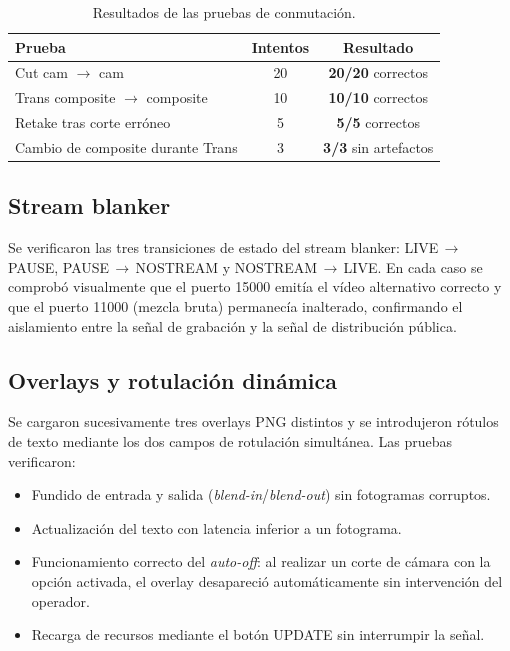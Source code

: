 \begin{table}[H]
  \centering
  \caption{Resultados de las pruebas de conmutación.}
  \label{tab:pruebas_conmutacion}
  \begin{tabular}{|l|c|c|}
    \hline
    \textbf{Prueba} & \textbf{Intentos} & \textbf{Resultado} \\
    \hline
    Cut cam $\rightarrow$ cam            & 20 & \textbf{20/20} correctos \\
    Trans composite $\rightarrow$ composite & 10 & \textbf{10/10} correctos \\
    Retake tras corte erróneo           & 5  & \textbf{5/5} correctos \\
    Cambio de composite durante Trans   & 3  & \textbf{3/3} sin artefactos \\
    \hline
  \end{tabular}
\end{table}

\subsection{Stream blanker}

Se verificaron las tres transiciones de estado del stream blanker:
LIVE\,$\rightarrow$\,PAUSE, PAUSE\,$\rightarrow$\,NOSTREAM y
NOSTREAM\,$\rightarrow$\,LIVE. En cada caso se comprobó visualmente que el puerto
15000 emitía el vídeo alternativo correcto y que el puerto 11000 (mezcla bruta)
permanecía inalterado, confirmando el aislamiento entre la señal de grabación y la
señal de distribución pública.

\subsection{Overlays y rotulación dinámica}

Se cargaron sucesivamente tres overlays PNG distintos y se introdujeron rótulos de
texto mediante los dos campos de rotulación simultánea. Las pruebas verificaron:

\begin{itemize}
  \item Fundido de entrada y salida (\textit{blend-in}/\textit{blend-out}) sin
        fotogramas corruptos.
  \item Actualización del texto con latencia inferior a un fotograma.
  \item Funcionamiento correcto del \textit{auto-off}: al realizar un corte de cámara
        con la opción activada, el overlay desapareció automáticamente sin
        intervención del operador.
  \item Recarga de recursos mediante el botón UPDATE sin interrumpir la señal.
\end{itemize}

